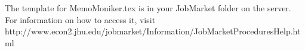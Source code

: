 The template for MemoMoniker.tex is in your JobMarket folder on the server. For information on how to access it, visit http://www.econ2.jhu.edu/jobmarket/Information/JobMarketProceduresHelp.html
